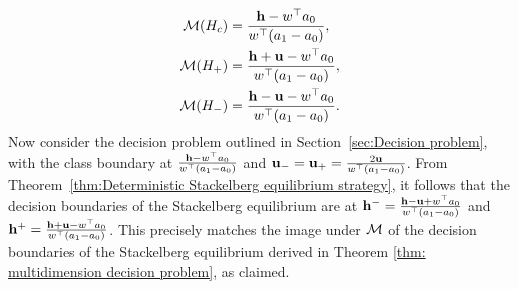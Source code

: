 \begin{equation*}
\begin{aligned}
    \mathcal{M}(H_c) &= \frac{\mathbf{h} - w^\top a_0}{w^\top (a_1-a_0)}, \\
    \mathcal{M}(H_+) &= \frac{\mathbf{h} + \mathbf{u} - w^\top a_0}{w^\top (a_1-a_0)}, \\
    \mathcal{M}(H_-) &= \frac{\mathbf{h} - \mathbf{u} - w^\top a_0}{w^\top (a_1-a_0)}.
\end{aligned}
\end{equation*}
Now consider the decision problem outlined in Section~\ref{sec:Decision problem}, with the class boundary at $\frac{\mathbf{h} - w^\top a_0 }{w^\top(a_1-a_0)}$ and $\mathbf{u_-} = \mathbf{u_+} = \frac{2\mathbf{u}}{w^\top (a_1-a_0)}$. From Theorem~\ref{thm:Deterministic Stackelberg equilibrium strategy}, it follows that the decision
boundaries of the Stackelberg equilibrium are at $\mathbf{h^{-}} = \frac{\mathbf{h} - \mathbf{u} + w^\top a_0}{w^\top (a_1-a_0)}$ and $\mathbf{h^{+}} = \frac{\mathbf{h} + \mathbf{u} - w^\top a_0}{w^\top (a_1-a_0)}$. This precisely matches the image under $\mathcal{M}$ of the decision boundaries of the Stackelberg equilibrium derived in Theorem \ref{thm: multidimension decision problem}, as claimed.